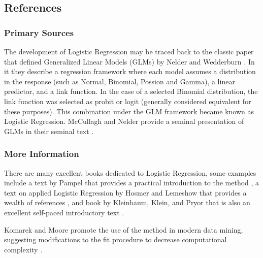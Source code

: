 \subsection{References}

\subsubsection{Primary Sources}
The development of Logistic Regression may be traced back to the classic paper that defined Generalized Linear Models (GLMs) by Nelder and Wedderburn \cite{Nelder1972}. In it they describe a regression framework where each model assumes a distribution in the response (such as Normal, Binomial, Possion and Gamma), a linear predictor, and a link function. In the case of a selected Binomial distribution, the link function was selected as probit or logit (generally considered equivalent for these purposes). This combination under the GLM framework became known as Logistic Regression.
McCullagh and Nelder provide a seminal presentation of GLMs in their seminal text \cite{McCullagh1989}.


\subsubsection{More Information}
There are many excellent books dedicated to Logistic Regression, some examples include a text by Pampel that provides a practical introduction to the method \cite{Pampel2000}, a text on applied Logistic Regression by Hosmer and Lemeshow that provides a wealth of references \cite{Hosmer2000}, and book by Kleinbaum, Klein, and Pryor that is also an excellent self-paced introductory text \cite{Kleinbaum2010}.

Komarek and Moore promote the use of the method in modern data mining, suggesting modifications to the fit procedure to decrease computational complexity \cite{Komarek2005}.



